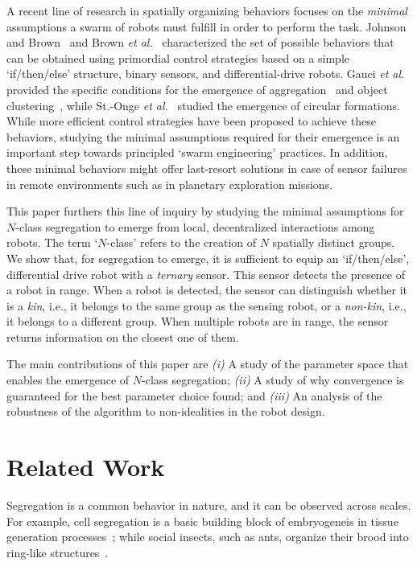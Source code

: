 \documentclass[letterpaper, 10 pt, conference]{ieeeconf}
\begin{document}
A recent line of research in spatially organizing behaviors focuses on the
\emph{minimal} assumptions a swarm of robots must fulfill in order to perform the
task. Johnson and Brown~\cite{johnson_evolving_2016} and Brown \emph{et
al.}~\cite{brown_discovery_2018} characterized the set of possible behaviors
that can be obtained using primordial control strategies based on a simple
`if/then/else' structure, binary sensors, and differential-drive robots. Gauci
\emph{et al.} provided the specific conditions for the emergence of
aggregation~\cite{gauci_evolving_2014} and object
clustering~\cite{gauci_clustering_2014}, while St.-Onge \emph{et
al.}~\cite{StOnge:IROS2018} studied the emergence of circular
formations. While more efficient control strategies have been proposed to
achieve these behaviors, studying the minimal assumptions required for their emergence is
an important step towards principled `swarm engineering' practices. In addition,
these minimal behaviors might offer last-resort solutions in case of sensor
failures in remote environments such as in planetary exploration missions.

This paper furthers this line of inquiry by studying the minimal assumptions for
$N$-class segregation to emerge from local, decentralized interactions among
robots. The term `$N$-class' refers to the creation of $N$ spatially distinct
groups. We show that, for segregation to emerge, it is sufficient to equip an
`if/then/else', differential drive robot with a \emph{ternary} sensor. This
sensor detects the presence of a robot in range. When a robot is detected, the
sensor can distinguish whether it is a \emph{kin}, i.e., it belongs to the same
group as the sensing robot, or a \emph{non-kin}, i.e., it belongs to a different
group. When multiple robots are in range, the sensor returns information on the
closest one of them.

The main contributions of this paper are \emph{(i)} A study of the parameter
space that enables the emergence of $N$-class segregation; \emph{(ii)} A study
of why convergence is guaranteed for the best parameter choice found; and
\emph{(iii)} An analysis of the robustness of the algorithm to non-idealities in
the robot design.

\section{Related Work}
Segregation is a common behavior in nature, and it can be observed across
scales. For example, cell segregation is a basic building block of embryogeneis
in tissue generation processes~\cite{batlle_molecular_2012,Steinberg1963}; while
social insects, such as ants, organize their brood into ring-like
structures~\cite{Franks1992}.
\end{document}
